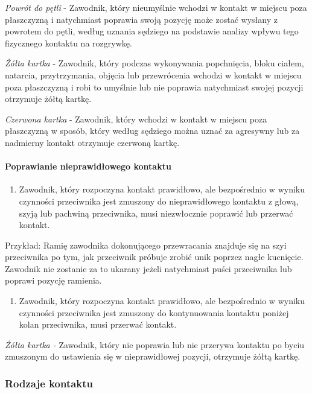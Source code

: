 \documentclass[12pt]{article}
\begin{document}
\emph{Powrót do pętli} - Zawodnik, który nieumyślnie wchodzi w kontakt w
miejscu poza płaszczyzną i natychmiast poprawia swoją pozycję może
zostać wysłany z powrotem do pętli, według uznania sędziego na podstawie
analizy wpływu tego fizycznego kontaktu na rozgrywkę.

\emph{Żółta kartka} - Zawodnik, który podczas wykonywania popchnięcia,
bloku ciałem, natarcia, przytrzymania, objęcia lub przewrócenia wchodzi
w kontakt w miejscu poza płaszczyzną i robi to umyślnie lub nie poprawia
natychmiast swojej pozycji otrzymuje żółtą kartkę.

\emph{Czerwona kartka} - Zawodnik, który wchodzi w kontakt w miejscu
poza płaszczyzną w sposób, który według sędziego można uznać za
agresywny lub za nadmierny kontakt otrzymuje czerwoną kartkę.

\paragraph{Poprawianie nieprawidłowego kontaktu}

\begin{enumerate}
	\item
	      Zawodnik, który rozpoczyna kontakt prawidłowo, ale bezpośrednio w
	      wyniku czynności przeciwnika jest zmuszony do nieprawidłowego kontaktu
	      z głową, szyją lub pachwiną przeciwnika, musi niezwłocznie poprawić
	      lub przerwać kontakt.
\end{enumerate}

Przykład: Ramię zawodnika dokonującego przewracania
znajduje się na szyi przeciwnika po tym, jak przeciwnik próbuje zrobić
unik poprzez nagłe kucnięcie. Zawodnik nie zostanie za to ukarany jeżeli
natychmiast puści przeciwnika lub poprawi pozycję ramienia.

\begin{enumerate}[resume]
	\item
	      Zawodnik, który rozpoczyna kontakt prawidłowo, ale bezpośrednio w
	      wyniku czynności przeciwnika jest zmuszony do kontynuowania kontaktu
	      poniżej kolan przeciwnika, musi przerwać kontakt.
\end{enumerate}

\emph{Żółta kartka -} Zawodnik, który nie poprawia lub nie przerywa
kontaktu po byciu zmuszonym do ustawienia się w nieprawidłowej pozycji,
otrzymuje żółtą kartkę.

\subsubsection{Rodzaje kontaktu}
\end{document}
